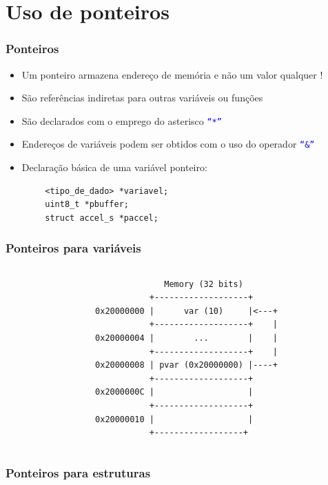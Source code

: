 \documentclass{beamer}
\begin{document}
\section{Uso de ponteiros}

\begin{frame}[fragile]
	\frametitle{Ponteiros}
	\begin{itemize}
		\item Um ponteiro armazena endereço de memória e não um valor qualquer !
		\item São referências indiretas para outras variáveis ou funções
		\item São declarados com o emprego do asterisco \texttt{\textcolor{blue}{``*''}}
		\item Endereços de variáveis podem ser obtidos com o uso do operador \texttt{\textcolor{blue}{``\&''}}
		\item Declaração básica de uma variável ponteiro:
	\end{itemize}
    {\footnotesize
	\begin{verbatim}
        <tipo_de_dado> *variavel;
        uint8_t *pbuffer;
        struct accel_s *paccel;
	\end{verbatim}
    }
\end{frame}

\begin{frame}[fragile]
	\frametitle{Ponteiros para variáveis}
	\begin{columns}[T] %
	\begin{column}{.50\textwidth}
		
	\end{column}%
	\hfill%
	\begin{column}{.50\textwidth}
	 {\tiny
	\begin{verbatim}
              Memory (32 bits)
           +-------------------+
0x20000000 |      var (10)     |<---+
           +-------------------+    |
0x20000004 |        ...        |    |
           +-------------------+    |
0x20000008 | pvar (0x20000000) |----+
           +-------------------+
0x2000000C |                   |
           +-------------------+
0x20000010 |                   |
           +------------------+
	\end{verbatim}
}
	\end{column}%
\end{columns}
\end{frame}

\begin{frame}[fragile]
	\frametitle{Ponteiros para estruturas}
	\begin{columns}[T] %
	\begin{column}{.75\textwidth}
		
	\end{column}%
	\hfill%
	\begin{column}{.25\textwidth}
	\end{column}%
\end{columns}
\end{frame}
\end{document}

